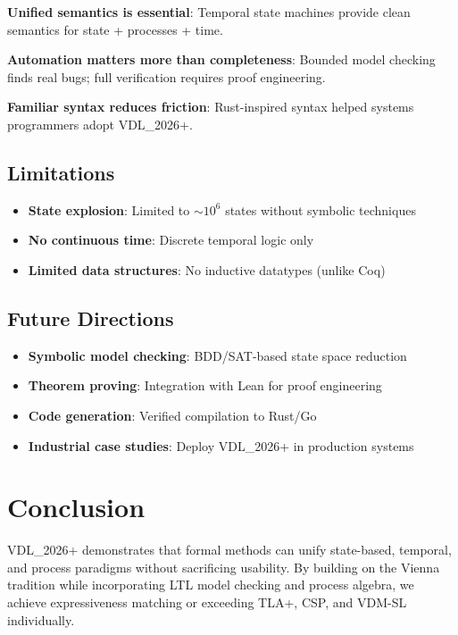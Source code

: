 \documentclass[conference]{IEEEtran}
\begin{document}
\textbf{Unified semantics is essential}: Temporal state machines provide clean semantics for state + processes + time.

\textbf{Automation matters more than completeness}: Bounded model checking finds real bugs; full verification requires proof engineering.

\textbf{Familiar syntax reduces friction}: Rust-inspired syntax helped systems programmers adopt VDL\_2026+.

\subsection{Limitations}

\begin{itemize}
\item \textbf{State explosion}: Limited to $\sim10^6$ states without symbolic techniques
\item \textbf{No continuous time}: Discrete temporal logic only
\item \textbf{Limited data structures}: No inductive datatypes (unlike Coq)
\end{itemize}

\subsection{Future Directions}

\begin{itemize}
\item \textbf{Symbolic model checking}: BDD/SAT-based state space reduction
\item \textbf{Theorem proving}: Integration with Lean for proof engineering
\item \textbf{Code generation}: Verified compilation to Rust/Go
\item \textbf{Industrial case studies}: Deploy VDL\_2026+ in production systems
\end{itemize}

\section{Conclusion}
\label{sec:conclusion}

VDL\_2026+ demonstrates that formal methods can unify state-based, temporal, and process paradigms without sacrificing usability. By building on the Vienna tradition while incorporating LTL model checking and process algebra, we achieve expressiveness matching or exceeding TLA+, CSP, and VDM-SL individually.
\end{document}
